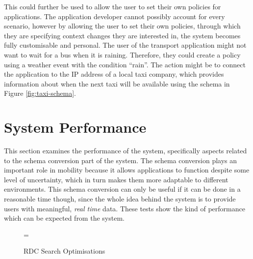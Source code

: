 \documentclass[12pt,twoside,notitlepage]{report}
\begin{document}
This could further be used to allow the user to set their own policies for applications. 
The application developer cannot possibly account for every scenario, however by allowing the user to set their own policies, through which they are specifying context changes they are interested in, the system becomes fully customisable and personal. 
The user of the transport application might not want to wait for a bus when it is raining. 
Therefore, they could create a policy using a weather event with the condition ``rain''. 
The action might be to connect the application to the IP address of a local taxi company, which provides information about when the next taxi will be available using the schema in Figure \ref{fig:taxi-schema}.





\section{System Performance}

This section examines the performance of the system, specifically aspects related to the schema conversion part of the system. 
The schema conversion plays an important role in mobility because it allows applications to function despite some level of uncertainty, which in turn makes them more adaptable to different environments. 
This schema conversion can only be useful if it can be done in a reasonable time though, since the whole idea behind the system is to provide users with meaningful, {\sl real time} data. 
These tests show the kind of performance which can be expected from the system. 

\begin{figure}[t]
\epsfxsize=\hsize
\centerline{}
\caption{RDC Search Optimisations}
\label{fig:rdc_search_optimisations}
\end{figure}
\end{document}
